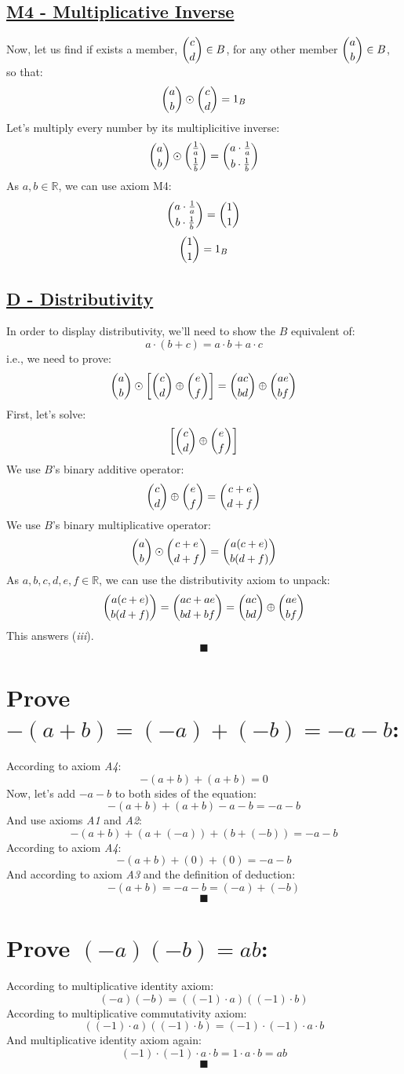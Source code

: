 \documentclass[a4paper, 12pt]{article}
\newcommand{\sub}[1]{\subsection{\underline{#1}}}
\newcommand{\?}{\stackrel{?}{=}}
\newcommand{\R}{\ensuremath{\mathbb{R}}}
\renewcommand{\qed}{$$\blacksquare$$}
\begin{document}
    \sub{M4 - Multiplicative Inverse}
        Now, let us find if exists a member, $\dbinom{c}{d} \in{B}$, for any other member $\dbinom{a}{b} \in{B}$, so that:
        $$ \dbinom{a}{b}\odot\dbinom{c}{d} = 1_{B} $$
        Let's multiply every number by its multiplicitive inverse:
        $$ \dbinom{a}{b}\odot\dbinom{\frac{1}{a}}{\frac{1}{b}}=\dbinom{a\cdot{\frac{1}{a}}}{b\cdot{\frac{1}{b}}} $$
        As $a,b \in {\R}$, we can use axiom M4:
        $$ \dbinom{a\cdot{\frac{1}{a}}}{b\cdot{\frac{1}{b}}} = \dbinom{1}{1} $$
        $$ \dbinom{1}{1} = 1_{B} $$

    \sub{D - Distributivity}
    In order to display distributivity, we'll need to show the $B$ equivalent of:
    $$ a\cdot{(b+c)}=a\cdot{b}+a\cdot{c} $$
    i.e., we need to prove:
    $$ \dbinom{a}{b} \odot \bigg{[} \dbinom{c}{d} \oplus \dbinom{e}{f} \bigg{]} = \dbinom{ac}{bd} \oplus \dbinom{ae}{bf} $$
    First, let's solve: $$ \bigg{[} \dbinom{c}{d} \oplus \dbinom{e}{f} \bigg{]} $$
    We use $B$'s binary additive operator:
    $$ \dbinom{c}{d} \oplus \dbinom{e}{f} = \dbinom{c+e}{d+f} $$
    We use $B$'s binary multiplicative operator: $$ \dbinom{a}{b} \odot \dbinom{c+e}{d+f} = \dbinom{a(c+e)}{b(d+f)} $$
    As $a,b,c,d,e,f \in {\R}$, we can use the distributivity axiom to unpack:
    $$ \dbinom{a(c+e)}{b(d+f)} = \dbinom{ac+ae}{bd+bf} = \dbinom{ac}{bd} \oplus \dbinom{ae}{bf} $$
    This answers (\textit{iii}).
    \qed
    \pagebreak

\setcounter{section}{22}
\section{Prove $-(a+b)=(-a)+(-b)=-a-b$:}
According to axiom \textit{A4}: $$ -(a+b) + (a+b) = 0$$
Now, let's add $-a-b$ to both sides of the equation: $$ -(a+b)+(a+b)-a-b=-a-b $$
And use axioms \textit{A1} and \textit{A2}: $$ -(a+b)+(a+(-a))+(b+(-b))=-a-b $$
According to axiom \textit{A4}: $$ -(a+b)+(0)+(0)=-a-b $$
And according to axiom \textit{A3} and the definition of deduction: $$ -(a+b)=-a-b=(-a)+(-b) $$
\qed

\setcounter{section}{25}
\section{Prove $ (-a)(-b) = ab $:}
According to multiplicative identity axiom: $$ (-a)(-b) = ((-1)\cdot{a})((-1)\cdot{b}) $$
According to multiplicative commutativity axiom: $$ ((-1)\cdot{a})((-1)\cdot{b}) = (-1)\cdot(-1)\cdot{a}\cdot{b} $$
And multiplicative identity axiom again: $$ (-1)\cdot(-1)\cdot{a}\cdot{b} = 1 \cdot{a} \cdot{b} = ab $$
\qed\pagebreak
\end{document}
